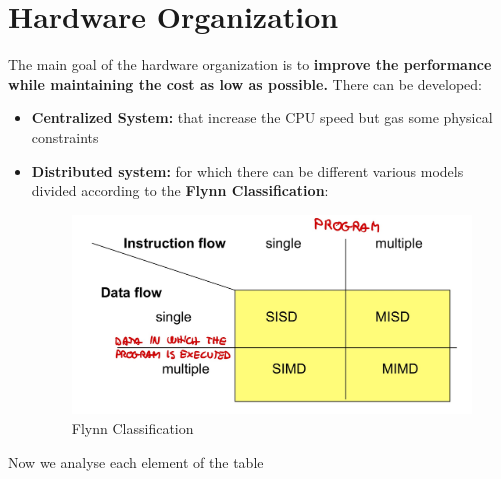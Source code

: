 \section{Hardware Organization}
The main goal of the hardware organization is to \textbf{improve the performance while maintaining the cost as low as possible.} There can be developed:
\begin{itemize}
    \item \textbf{Centralized System:} that increase the CPU speed but gas some physical constraints
    \item \textbf{Distributed system:} for which there can be different various models divided according to the \textbf{Flynn Classification}:
    \begin{figure}
        \centering
        \includegraphics[width=.7\linewidth]{images/distributedSystem/DSArchitecture.jpeg}
        \caption{Flynn Classification}
    \end{figure}
\end{itemize}
Now we analyse each element of the table
